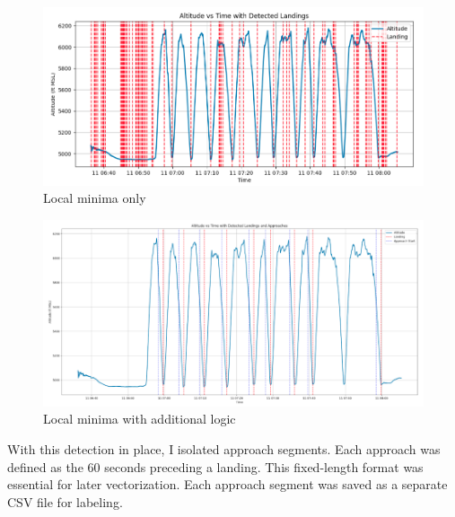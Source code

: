 \documentclass[conference]{IEEEtran}
\begin{document}
\begin{figure}[H]
    \centerline{\includegraphics[width=\linewidth]{figs/local_minima_only.png}}
    \caption{Local minima only}
\end{figure}

\begin{figure}[H]
    \centerline{\includegraphics[width=\linewidth]{figs/additional_logic1.png}}
    \caption{Local minima with additional logic}
\end{figure}

With this detection in place, I isolated approach segments. Each approach was defined as the 60 seconds preceding a landing. This fixed-length format was essential for later vectorization. Each approach segment was saved as a separate CSV file for labeling.
\end{document}
